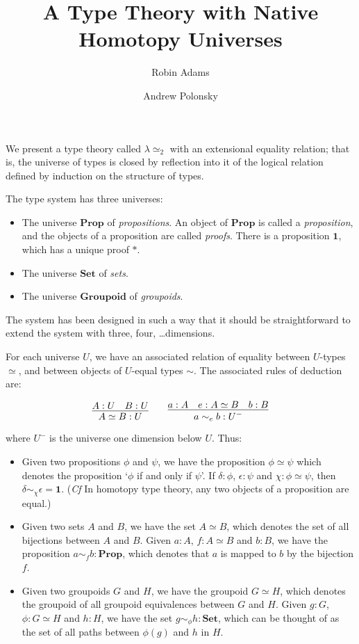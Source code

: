 \documentclass{easychair}
\title{A Type Theory with Native Homotopy Universes}
\author{Robin Adams\inst{1} \and Andrew Polonsky\inst{2}}
\institute{Universitetet i Bergen \and University Paris Diderot}
\newcommand{\Prop}{\ensuremath{\mathbf{Prop}}}
\newcommand{\Set}{\ensuremath{\mathbf{Set}}}
\newcommand{\Groupoid}{\ensuremath{\mathbf{Groupoid}}}
\newcommand{\LEtwo}{\ensuremath{\lambda \! \! \simeq_2}}
\begin{document}
\maketitle

We present a type theory called $\LEtwo$ with an extensional equality relation; that is, the universe of types is closed by reflection into it of the logical relation defined by induction on the structure of types.

The type system has three universes:
\begin{itemize}
\item
The universe $\Prop$ of \emph{propositions}.  An object of $\Prop$ is
called a \emph{proposition}, and the objects of a proposition are
called \emph{proofs}.  There is a proposition $\mathbf{1}$, which has
a unique proof $*$.
\item
The universe $\Set$ of \emph{sets}.
\item
The universe $\Groupoid$ of \emph{groupoids}.
\end{itemize}
The system has been designed in such a way that it should be straightforward to extend the system with three, four, \ldots dimensions.

For each universe $U$, we have an associated relation of equality
between $U$-types $\simeq$, and between objects of $U$-equal
types $\sim$.  The associated rules of deduction are:

\[ \infer{A \simeq B : U}{A : U \quad B : U}
\qquad
\infer{a \sim_e b : U^-}{a : A \quad e : A \simeq B \quad b : B} \]

where $U^-$ is the universe one dimension below $U$.  Thus:
\begin{itemize}
\item
Given two propositions $\phi$ and $\psi$, we have the proposition $\phi \simeq \psi$ which denotes the proposition `$\phi$ if and only if $\psi$'.  If $\delta : \phi$, $\epsilon : \psi$ and $\chi : \phi \simeq \psi$, then $\delta \sim_\chi \epsilon = \mathbf{1}$.  (\emph{Cf} In homotopy type theory, any two objects of a proposition are equal.)
\item
Given two sets $A$ and $B$, we have the set $A \simeq B$, which denotes the set of all bijections between $A$ and $B$.  Given $a : A$, $f : A \simeq B$ and $b : B$, we have the proposition $a \sim_f b : \Prop$, which denotes that $a$ is mapped to $b$ by the bijection $f$.
\item
Given two groupoids $G$ and $H$, we have the groupoid $G \simeq H$,
which denotes the groupoid of all groupoid equivalences between $G$ and $H$.  Given $g : G$, $\phi : G \simeq H$ and $h : H$, we have the set $g \sim_\phi h : \Set$, which can be thought of as the set of all paths between $\phi(g)$ and $h$ in $H$.
\end{itemize}
\end{document}
